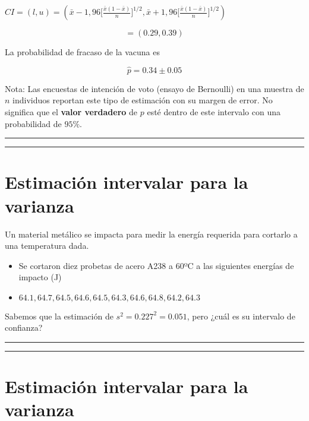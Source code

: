 \documentclass[
]{book}
\begin{document}
\(CI=(l,u)=(\bar{x}-1,96 \big[\frac{\bar{x}(1-\bar{x})}{n} \big]^{1/2} , \bar{x}+1,96 \big[\frac{\bar{x}(1-\bar{x})}{n} \big]^{1/2})\)

\[=(0.29,0.39)\]

La probabilidad de fracaso de la vacuna es

\[\hat{p}=0.34 \pm 0.05\]

Nota: Las encuestas de intención de voto (ensayo de Bernoulli) en una muestra de \(n\) individuos reportan este tipo de estimación con su margen de error. No significa que el \textbf{valor verdadero} de \(p\) esté dentro de este intervalo con una probabilidad de \(95\%\).

\begin{center}\rule{0.5\linewidth}{0.5pt}\end{center}

\begin{center}\rule{0.5\linewidth}{0.5pt}\end{center}

\hypertarget{estimaciuxf3n-intervalar-para-la-varianza}{%
\section{Estimación intervalar para la varianza}\label{estimaciuxf3n-intervalar-para-la-varianza}}

Un material metálico se impacta para medir la energía requerida para cortarlo a una temperatura dada.

\begin{itemize}
\item
  Se cortaron diez probetas de acero A238 a 60ºC a las siguientes energías de impacto (J)
\item
  \(64.1, 64.7, 64.5, 64.6, 64.5, 64.3, 64.6, 64.8, 64.2, 64.3\)
\end{itemize}

Sabemos que la estimación de \(s^2=0.227^2=0.051\), pero ¿cuál es su intervalo de confianza?

\begin{center}\rule{0.5\linewidth}{0.5pt}\end{center}

\begin{center}\rule{0.5\linewidth}{0.5pt}\end{center}

\hypertarget{estimaciuxf3n-intervalar-para-la-varianza-1}{%
\section{Estimación intervalar para la varianza}\label{estimaciuxf3n-intervalar-para-la-varianza-1}}
\end{document}
